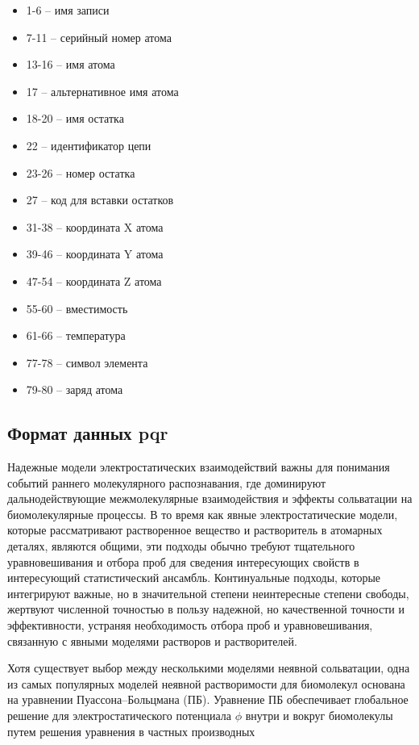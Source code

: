 \begin{itemize}
	\item 1-6 -- имя записи
	\item 7-11 -- серийный номер атома
	\item 13-16 -- имя атома
	\item 17 -- альтернативное имя атома
	\item 18-20 -- имя остатка
	\item 22 -- идентификатор цепи
	\item 23-26 -- номер остатка
	\item 27 -- код для вставки остатков
	\item 31-38 -- координата X атома
	\item 39-46 -- координата Y атома
	\item 47-54 -- координата Z атома
	\item 55-60 -- вместимость
	\item 61-66 -- температура
	\item 77-78 -- символ элемента
	\item 79-80 -- заряд атома
\end{itemize}

\subsection{Формат данных pqr}

Надежные модели электростатических взаимодействий важны для понимания событий раннего молекулярного распознавания, где доминируют дальнодействующие межмолекулярные взаимодействия и эффекты сольватации на биомолекулярные процессы. В то время как явные электростатические модели, которые рассматривают растворенное вещество и растворитель в атомарных деталях, являются общими, эти подходы обычно требуют тщательного уравновешивания и отбора проб для сведения интересующих свойств в интересующий статистический ансамбль. Континуальные подходы, которые интегрируют важные, но в значительной степени неинтересные степени свободы, жертвуют численной точностью в пользу надежной, но качественной точности и эффективности, устраняя необходимость отбора проб и уравновешивания, связанную с явными моделями растворов и растворителей.

Хотя существует выбор между несколькими моделями неявной сольватации, одна из самых популярных моделей неявной растворимости для биомолекул основана на уравнении Пуассона–Больцмана (ПБ). Уравнение ПБ обеспечивает глобальное решение для электростатического потенциала $\phi$ внутри и вокруг биомолекулы путем решения уравнения в частных производных

